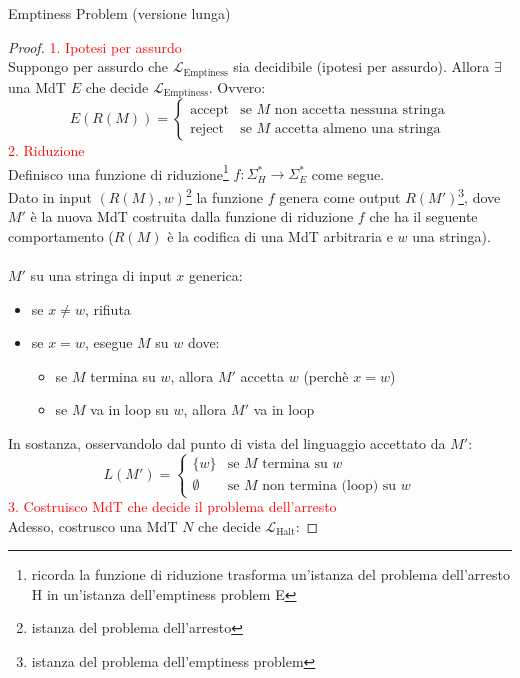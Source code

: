 \documentclass{article}  %
\theoremstyle{definition}
\begin{document}
\begin{theorem}{Emptiness Problem (versione lunga)}
\begin{proof}
    \textcolor{red}{1. Ipotesi per assurdo} \\
    Suppongo per assurdo che $\mathcal{L}_{\text{Emptiness}}$ sia decidibile (ipotesi per assurdo). Allora $\exists$ una MdT $E$ che decide $\mathcal{L}_{\text{Emptiness}}$.
    Ovvero:
    \[
    E(R(M)) =
    \begin{cases}
      \text{accept} & \text{se } M \text{ non accetta nessuna stringa} \\
      \text{reject} & \text{se } M \text{  accetta almeno una stringa}
    \end{cases}
    \]
    \textcolor{red}{2. Riduzione} \\
    Definisco una funzione di riduzione\footnote{ricorda la funzione di riduzione trasforma un'istanza del problema dell'arresto H in un'istanza dell'emptiness problem E}
     $f: \Sigma_H^* \rightarrow \Sigma_E^*$ come segue. \\
    Dato in input $(R(M),w)$\footnote{istanza del problema dell'arresto}  la funzione $f$ genera come output $R(M')$\footnote{istanza del problema dell'emptiness problem}, 
    dove $M'$ è la nuova MdT costruita dalla funzione di riduzione $f$ che ha il seguente comportamento ($R(M)$ è la codifica di una MdT arbitraria
    e $w$ una stringa). \\ \\ $M'$ su una stringa di input $x$ generica:
    \begin{itemize}
      \item se $x \neq w$, rifiuta
      \item se $x = w$, esegue $M$ su $w$ dove:
      \begin{itemize}
        \item se $M$ termina su $w$, allora $M'$ accetta $w$ (perchè $x=w$)
        \item se $M$ va in loop su $w$, allora $M'$ va in loop
      \end{itemize}
    \end{itemize}
    In sostanza, osservandolo dal punto di vista del linguaggio accettato da $M'$:
    \[
    L(M') =
    \begin{cases}
      \{w\} & \text{se } M \text{ termina su } w\\
      \emptyset & \text{se } M \text{ non termina (loop) su } w
    \end{cases}
    \]
    \textcolor{red}{3. Costruisco MdT che decide il problema dell'arresto} \\
    Adesso, costrusco una MdT $N$ che decide $\mathcal{L}_{\text{Halt}}$:

\end{proof}
\end{theorem}
\end{document}
